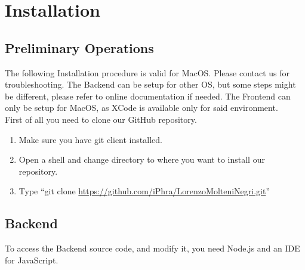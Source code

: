 \documentclass[titlepage]{article}
\begin{document}
	\pagebreak
	\section{Installation}
	\subsection{Preliminary Operations}
	The following Installation procedure is valid for MacOS. Please contact us for troubleshooting.
	The Backend can be setup for other OS, but some steps might be different, please refer to online documentation if needed.
	The Frontend can only be setup for MacOS, as XCode is available only for said environment.\\
	\linebreak
	First of all you need to clone our GitHub repository.
	\begin{enumerate}
		\item Make sure you have git client installed.
		\item Open a shell and change directory to where you want to install our repository.
		\item Type “git clone \href{https://github.com/iPhra/LorenzoMolteniNegri.git}{https://github.com/iPhra/LorenzoMolteniNegri.git}”
	\end{enumerate}
	
	\subsection{Backend}
	To access the Backend source code, and modify it, you need Node.js and an IDE for JavaScript.
	
\end{document}
